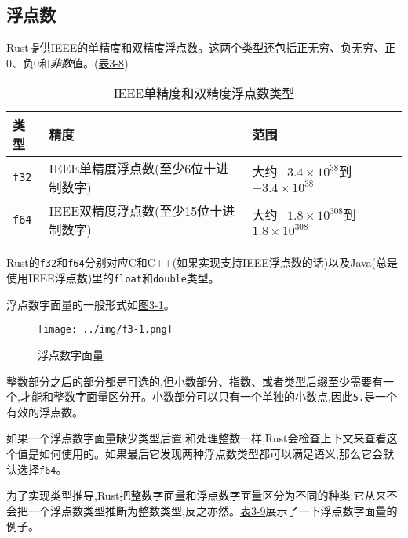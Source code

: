 \subsection{浮点数}
Rust提供IEEE的单精度和双精度浮点数。这两个类型还包括正无穷、负无穷、正0、负0和\emph{非数}值。(\hyperref[t3-8]{表3-8})

\begin{table}[htbp]
    \centering
    \caption{IEEE单精度和双精度浮点数类型}
    \label{t3-8}
    \begin{tabular}{lll}
        \hline
        \textbf{类型}   & \textbf{精度} &   \textbf{范围}   \\
        \hline
        \texttt{f32}    & IEEE单精度浮点数(至少6位十进制数字)    & 大约$-3.4\times10^{38}$到$+3.4\times10^{38}$    \\
        \rowcolor{tablecolor}
        \texttt{f64}    & IEEE双精度浮点数(至少15位十进制数字)    & 大约$-1.8\times10^{308}$到$1.8\times10^{308}$   \\
    \end{tabular}
\end{table}

Rust的\texttt{f32}和\texttt{f64}分别对应C和C++(如果实现支持IEEE浮点数的话)以及Java(总是使用IEEE浮点数)里的\texttt{float}和\texttt{double}类型。

浮点数字面量的一般形式如\hyperref[f3-1]{图3-1}。
\begin{figure}[htbp]
    \centering
    \texttt{[image: ../img/f3-1.png]}
    \caption{浮点数字面量}
    \label{f3-1}
\end{figure}

整数部分之后的部分都是可选的,但小数部分、指数、或者类型后缀至少需要有一个,才能和整数字面量区分开。小数部分可以只有一个单独的小数点,因此\texttt{5.}是一个有效的浮点数。

如果一个浮点数字面量缺少类型后置,和处理整数一样,Rust会检查上下文来查看这个值是如何使用的。如果最后它发现两种浮点数类型都可以满足语义,那么它会默认选择\texttt{f64}。

为了实现类型推导,Rust把整数字面量和浮点数字面量区分为不同的种类:它从来不会把一个浮点数类型推断为整数类型,反之亦然。\hyperref[t3-9]{表3-9}展示了一下浮点数字面量的例子。

